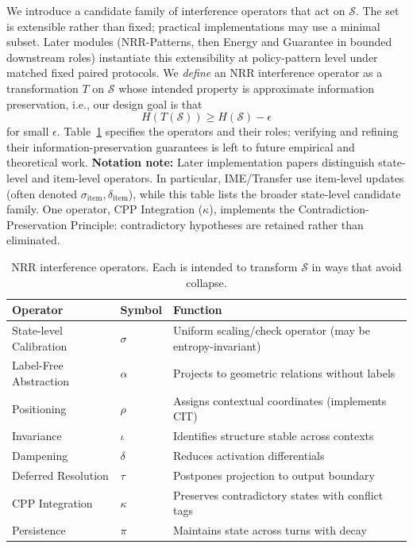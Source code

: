 \documentclass[11pt,a4paper]{article}
\begin{document}
We introduce a candidate family of interference operators that act on $\mathcal{S}$.
The set is extensible rather than fixed; practical implementations may use a minimal subset.
Later modules (NRR-Patterns, then Energy and Guarantee in bounded downstream roles) instantiate this extensibility at policy-pattern level under matched fixed paired protocols.
We \emph{define} an NRR interference operator as a transformation $T$ on $\mathcal{S}$
whose intended property is approximate information preservation, i.e., our design goal is that
\begin{equation}
H(T(\mathcal{S})) \geq H(\mathcal{S}) - \epsilon
\end{equation}
for small $\epsilon$.
Table~\ref{tab:operators} specifies the operators and their roles; verifying and refining their information-preservation guarantees is left to future empirical and theoretical work.
\textbf{Notation note:} Later implementation papers distinguish state-level and item-level operators.
In particular, IME/Transfer use item-level updates (often denoted $\sigma_{\text{item}}, \delta_{\text{item}}$),
while this table lists the broader state-level candidate family.
One operator, CPP Integration ($\kappa$), implements the Contradiction-Preservation Principle: contradictory hypotheses are retained rather than eliminated.

\begin{table}[h]
\centering
\small
\begin{tabular}{lll}
\toprule
\textbf{Operator} & \textbf{Symbol} & \textbf{Function} \\
\midrule
State-level Calibration & $\sigma$ & Uniform scaling/check operator (may be entropy-invariant) \\
Label-Free Abstraction & $\alpha$ & Projects to geometric relations without labels \\
Positioning & $\rho$ & Assigns contextual coordinates (implements CIT) \\
Invariance & $\iota$ & Identifies structure stable across contexts \\
Dampening & $\delta$ & Reduces activation differentials \\
Deferred Resolution & $\tau$ & Postpones projection to output boundary \\
CPP Integration & $\kappa$ & Preserves contradictory states with conflict tags \\
Persistence & $\pi$ & Maintains state across turns with decay \\
\bottomrule
\end{tabular}
\caption{NRR interference operators. Each is intended to transform $\mathcal{S}$ in ways that avoid collapse.}
\label{tab:operators}
\end{table}
\end{document}
